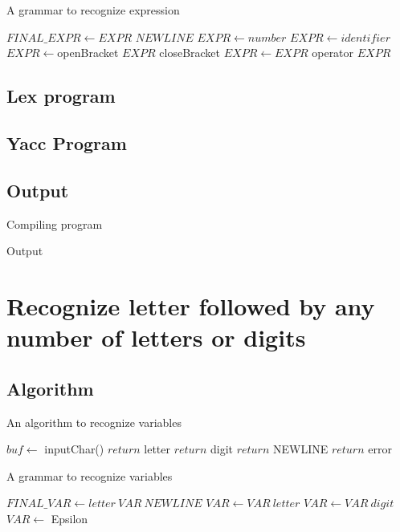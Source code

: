 \begin{algorithm}[H]
	\caption{A grammar to recognize expression}
	\begin{algorithmic}[1]
		\State $FINAL\_EXPR \gets EXPR$ $NEWLINE$
		\State $EXPR \gets number$
		\State $EXPR \gets identifier$
		\State $EXPR \gets $openBracket $EXPR$ closeBracket
		\State $EXPR \gets EXPR$ operator $EXPR$
	\end{algorithmic}
\end{algorithm}

\subsection{Lex program}

\subsection{Yacc Program}

\subsection{Output}
Compiling program



\vspace{0.5cm}
Output



\section{Recognize letter followed by any number of letters or digits}
\subsection{Algorithm}
\begin{algorithm}[H]
	\caption{An algorithm to recognize variables}
	\begin{algorithmic}[1]
		\State $buf \gets $ inputChar()
		\State $return$ letter
		\State $return$ digit
		\State $return$ NEWLINE
		\Else
		\State $return$ error
		\EndIf
	\end{algorithmic}
\end{algorithm}

\begin{algorithm}[H]
	\caption{A grammar to recognize variables}
	\begin{algorithmic}[1]
		\State $FINAL\_VAR \gets letter\ VAR\ NEWLINE$
		\State $VAR \gets VAR\ letter$
		\State $VAR \gets VAR\ digit$
		\State $VAR \gets$ Epsilon
	\end{algorithmic}
\end{algorithm}

